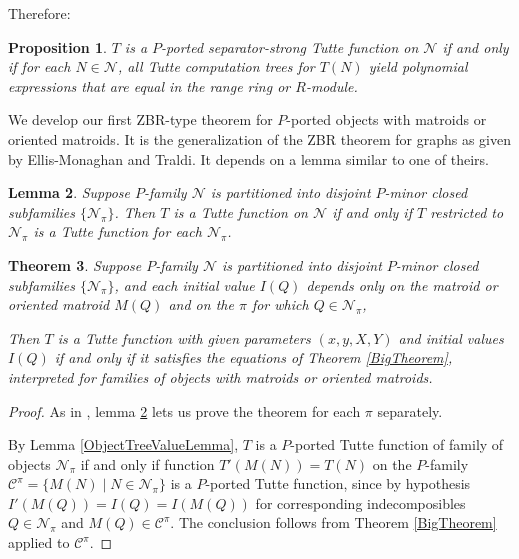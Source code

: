 \documentclass[12pt,leqno]{amsart}
\newtheorem{lem}{Lemma}
\newtheorem{prop}[lem]{Proposition}
\newtheorem{thm}[lem]{Theorem}
\theoremstyle{remark}
\begin{document}
Therefore:

\begin{prop}
$T$ is a $P$-ported separator-strong Tutte function
on $\mathcal{N}$ if and only if for each $N\in\mathcal{N}$,
all Tutte computation trees for $T(N)$ yield polynomial expressions
that are equal in the range ring or $R$-module.
\end{prop}

We develop our first ZBR-type theorem for $P$-ported objects
with matroids or oriented matroids.  It is the
generalization of the ZBR theorem for graphs as given
by Ellis-Monaghan and Traldi\cite{Ellis-Monaghan-Traldi}.  
It depends on a lemma similar to one of theirs.


\begin{lem}
\label{DisjSubclassLem}
Suppose $P$-family $\mathcal{N}$ is partitioned into
disjoint $P$-minor closed subfamilies $\{\mathcal{N}_{\pi}\}$.
Then $T$ is a Tutte function on $\mathcal{N}$ if and
only if $T$ restricted to $\mathcal{N}_{\pi}$ is
a Tutte function for each $\mathcal{N}_{\pi}$.
\end{lem}

\begin{thm}
\label{ZBRWildFamily}
Suppose $P$-family $\mathcal{N}$ is partitioned into
disjoint $P$-minor closed subfamilies $\{\mathcal{N}_{\pi}\}$,
and each initial value $I(Q)$ depends only on
the matroid or oriented matroid $M(Q)$ and on the
$\pi$ for which $Q\in\mathcal{N}_{\pi}$,

Then $T$ is a Tutte function with given parameters $(x,y,X,Y)$
and initial values $I(Q)$ if and only if it satisfies
the equations of Theorem \ref{BigTheorem}, interpreted
for families of objects with matroids or oriented matroids.
\end{thm}

\begin{proof}
As in \cite{Ellis-Monaghan-Traldi}, lemma
\ref{DisjSubclassLem} lets us prove the
theorem for each $\pi$ separately.


By Lemma \ref{ObjectTreeValueLemma}, $T$ is a 
$P$-ported Tutte function of family
of objects $\mathcal{N}_{\pi}$ if and only
if function $T'(M(N))=T(N)$ on the $P$-family 
$\mathcal{C}^{\pi}=\{M(N)\mid N\in\mathcal{N}_{\pi}\}$ is a $P$-ported Tutte 
function, since by hypothesis 
$I'(M(Q))=I(Q)=I(M(Q))$ for corresponding
indecomposibles $Q\in\mathcal{N}_{\pi}$ and 
$M(Q)\in\mathcal{C}^{\pi}$.
The conclusion follows
from Theorem \ref{BigTheorem} applied to $\mathcal{C}^{\pi}$.
\end{proof}
\end{document}

